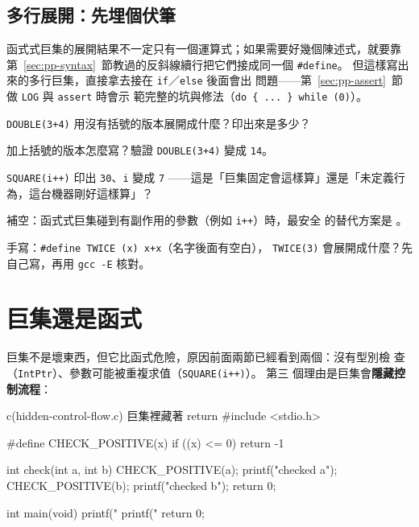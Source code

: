 \subsection{多行展開：先埋個伏筆}

函式式巨集的展開結果不一定只有一個運算式；如果需要好幾個陳述式，就要靠
第~\ref{sec:pp-syntax}~節教過的反斜線續行把它們接成同一個 \texttt{\#define}。
但這樣寫出來的多行巨集，直接拿去接在 \texttt{if}／\texttt{else} 後面會出
問題——第~\ref{sec:pp-assert}~節做 \texttt{LOG} 與 \texttt{assert} 時會示
範完整的坑與修法（\texttt{do \{ ... \} while (0)}）。


\begin{drills}[label=drills:pp-funcmacro]
\item \texttt{DOUBLE(3+4)} 用沒有括號的版本展開成什麼？印出來是多少？
\item 加上括號的版本怎麼寫？驗證 \texttt{DOUBLE(3+4)} 變成 \texttt{14}。
\item \texttt{SQUARE(i++)} 印出 \texttt{30}、\texttt{i} 變成 \texttt{7}
——這是「巨集固定會這樣算」還是「未定義行為，這台機器剛好這樣算」？
\item 補空：函式式巨集碰到有副作用的參數（例如 \texttt{i++}）時，最安全
的替代方案是 \underline{\hspace{2em}}。
\item 手寫：\texttt{\#define TWICE (x) x+x}（名字後面有空白），
\texttt{TWICE(3)} 會展開成什麼？先自己寫，再用 \texttt{gcc -E} 核對。
\end{drills}

\section{巨集還是函式}
\label{sec:pp-guidelines}

巨集不是壞東西，但它比函式危險，原因前面兩節已經看到兩個：沒有型別檢
查（\texttt{IntPtr}）、參數可能被重複求值（\texttt{SQUARE(i++)}）。 第三
個理由是巨集會\textbf{隱藏控制流程}：

\begin{example}{c}{(hidden-control-flow.c) 巨集裡藏著 return}
#include <stdio.h>

#define CHECK_POSITIVE(x) if ((x) <= 0) return -1

int check(int a, int b) {
    CHECK_POSITIVE(a);
    printf("checked a\n");
    CHECK_POSITIVE(b);
    printf("checked b\n");
    return 0;
}

int main(void) {
    printf("%
    printf("%
    return 0;
}
\end{example}

